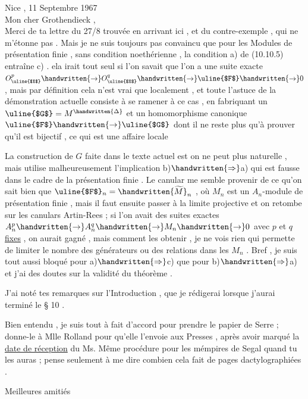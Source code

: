 Nice , 11 Septembre 1967\\

Mon cher Grothendieck ,\\

Merci de ta lettre du 27/8 trouvée en arrivant ici , et du contre-exemple , qui ne m'étonne pas . Mais je ne suis toujours pas convaincu que pour les Modules de présentation finie , sans condition noethérienne , la condition a) de (10.10.5) entraîne c) . ela irait tout seul si l'on savait que l'on a une suite exacte $O_{\text{\uline{$X$}}}^{p}\handwritten{\to}O_{\text{\uline{$X$}}}^{q}\handwritten{\to}\text{\uline{$F$}}\handwritten{\to}0$ , mais par définition cela  n'est vrai que localement , et toute l'astuce de la démonstration actuelle consiste à se ramener à ce cas , en fabriquant un $\text{\uline{$G$}}=M^{\handwritten{\Delta}}$ et un homomorphisme canonique $\text{\uline{$F$}}\handwritten{\to}\text{\uline{$G$}}$ dont il ne reste plus qu'à prouver qu'il est bijectif , ce qui est une affaire locale

La construction de \uline{$G$} faite dans le texte actuel est on ne peut plus naturelle , mais utilise malheureusement l'implication b)$\handwritten{\Rightarrow}$a) qui est fausse dans le cadre de la présentation finie . Le canular me semble provenir de ce qu'on sait bien que $\text{\uline{$F$}}_n=\handwritten{\widetilde{M}}_n$ , où $M_n$ est un $A_n$-module de présentation finie , mais il faut ensuite passer à la limite projective \reversemarginpar{}\normalmarginpar et on retombe sur les canulars Artin-Rees ; si l'on avait des suites exactes $A_n^p\handwritten{\to}A_n^q\handwritten{\to}M_n\handwritten{\to}0$ avec $p$ et $q$ \uline{fixes} , on aurait gagné , mais comment les obtenir , je ne vois rien qui permette de limiter le nombre des générateurs ou des relations dans les $M_n$ . Bref , je suis tout aussi bloqué pour  a)$\handwritten{\Rightarrow}$c) que pour b)$\handwritten{\Rightarrow}$a) et j'ai des doutes sur la validité du théorème .

J'ai noté tes remarques sur l'Introduction , que je rédigerai lorsque j'aurai terminé le § 10 .

Bien entendu , je suis tout à fait d'accord pour prendre le papier de Serre ; donne-le à Mlle Rolland pour qu'elle l'envoie aux Presses , après avoir marqué la \uline{date de réception} du Ms. Même procédure \reversemarginpar{}\normalmarginpar pour les mémpires de Segal quand tu les auras ; pense seulement à me dire combien cela fait de pages dactylographiées .

Meilleures amitiés\\
\\
